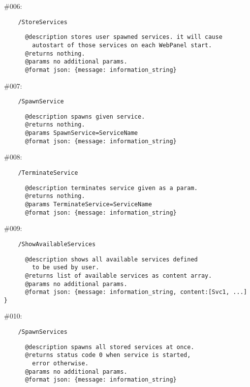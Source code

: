 \documentclass[11pt]{scrartcl}
\begin{document}
\begin{description}
    \item \#006:
      \begin{verbatim}
    /StoreServices
      \end{verbatim}
      \begin{verbatim}
      @description stores user spawned services. it will cause
        autostart of those services on each WebPanel start.
      @returns nothing.
      @params no additional params.
      @format json: {message: information_string}
      \end{verbatim}

    \item \#007:
      \begin{verbatim}
    /SpawnService
      \end{verbatim}
      \begin{verbatim}
      @description spawns given service.
      @returns nothing.
      @params SpawnService=ServiceName
      @format json: {message: information_string}
      \end{verbatim}

    \item \#008:
      \begin{verbatim}
    /TerminateService
      \end{verbatim}
      \begin{verbatim}
      @description terminates service given as a param.
      @returns nothing.
      @params TerminateService=ServiceName
      @format json: {message: information_string}
      \end{verbatim}

    \item \#009:
      \begin{verbatim}
    /ShowAvailableServices
      \end{verbatim}
      \begin{verbatim}
      @description shows all available services defined
        to be used by user.
      @returns list of available services as content array.
      @params no additional params.
      @format json: {message: information_string, content:[Svc1, ...] }
      \end{verbatim}

    \item \#010:
      \begin{verbatim}
    /SpawnServices
      \end{verbatim}
      \begin{verbatim}
      @description spawns all stored services at once.
      @returns status code 0 when service is started,
        error otherwise.
      @params no additional params.
      @format json: {message: information_string}
      \end{verbatim}


\end{description}
\end{document}
